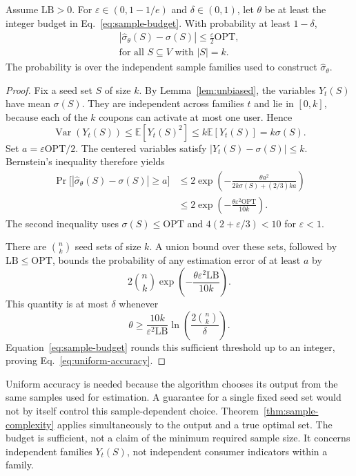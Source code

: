 \documentclass[sigconf]{acmart}
\begin{document}
\begin{theorem}
\label{thm:sample-complexity}
Assume $\mathrm{LB}>0$. For $\varepsilon\in(0,1-1/e)$ and
$\delta\in(0,1)$, let $\theta$ be at least the integer budget in
Eq.~\eqref{eq:sample-budget}. With probability at least $1-\delta$,
\begin{equation}
\label{eq:uniform-accuracy}
 \begin{gathered}
 \left|\hat\sigma_\theta(S)-\sigma(S)\right|
 \le\frac{\varepsilon}{2}\mathrm{OPT},\\
 \text{for all } S\subseteq V \text{ with } |S|=k.
 \end{gathered}
\end{equation}
The probability is over the independent sample families used to
construct $\hat\sigma_\theta$.
\end{theorem}
\begin{proof}\renewcommand{\qedsymbol}{}
Fix a seed set $S$ of size $k$. By Lemma~\ref{lem:unbiased}, the
variables $Y_t(S)$ have mean $\sigma(S)$. They are independent
across families $t$ and lie in $[0,k]$, because each of the $k$
coupons can activate at most one user. Hence
\[
 \operatorname{Var}(Y_t(S))\le\mathbb E[Y_t(S)^2]
 \le k\mathbb E[Y_t(S)]=k\sigma(S).
\]
Set $a=\varepsilon\mathrm{OPT}/2$. The centered variables satisfy
$|Y_t(S)-\sigma(S)|\le k$. Bernstein's inequality therefore yields
\begin{align}
\label{eq:bernstein}
 \Pr\bigl[|\hat\sigma_\theta(S)-\sigma(S)|\ge a\bigr]
 &\le 2\exp\left(-\frac{\theta a^2}
 {2k\sigma(S)+(2/3)ka}\right)\nonumber\\
 &\le 2\exp\left(-\frac{\theta\varepsilon^2\mathrm{OPT}}
 {10k}\right).
\end{align}
The second inequality uses $\sigma(S)\le\mathrm{OPT}$ and
$4(2+\varepsilon/3)<10$ for $\varepsilon<1$.

There are $\binom nk$ seed sets of size $k$. A union bound over
these sets, followed by $\mathrm{LB}\le\mathrm{OPT}$, bounds the
probability of any estimation error of at least $a$ by
\[
 2\binom nk\exp\left(-\frac{\theta\varepsilon^2\mathrm{LB}}
 {10k}\right).
\]
This quantity is at most $\delta$ whenever
\[
 \theta\ge\frac{10k}{\varepsilon^2\mathrm{LB}}
 \ln\left(\frac{2\binom nk}{\delta}\right).
\]
Equation~\eqref{eq:sample-budget} rounds this sufficient threshold
up to an integer, proving Eq.~\eqref{eq:uniform-accuracy}.
\end{proof}

Uniform accuracy is needed because the algorithm chooses its
output from the same samples used for estimation. A guarantee
for a single fixed seed set would not by itself control this
sample-dependent choice. Theorem~\ref{thm:sample-complexity}
applies simultaneously to the output and a true optimal set.
The budget is sufficient, not a claim of the minimum required
sample size. It concerns independent families $Y_t(S)$, not
independent consumer indicators within a family.
\end{document}
